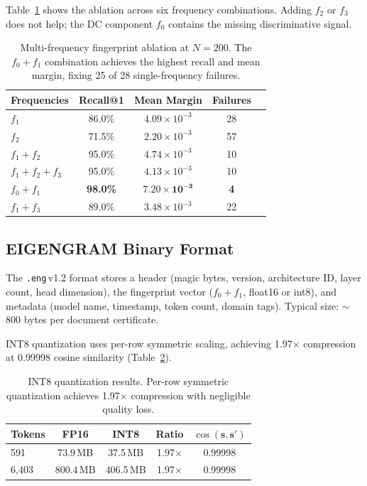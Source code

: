 \documentclass[11pt,twocolumn]{article}
\begin{document}
Table~\ref{tab:frequency-ablation} shows the ablation across six
frequency combinations. Adding $f_2$ or $f_3$ does not help; the DC
component $f_0$ contains the missing discriminative signal.

\begin{table}[t]
\centering
\caption{Multi-frequency fingerprint ablation at $N{=}200$. The
$f_0{+}f_1$ combination achieves the highest recall and mean margin,
fixing 25 of 28 single-frequency failures.}
\label{tab:frequency-ablation}
\small
\begin{tabular}{lcccc}
\toprule
Frequencies & Recall@1 & Mean Margin & Failures \\
\midrule
$f_1$ & 86.0\% & $4.09{\times}10^{-3}$ & 28 \\
$f_2$ & 71.5\% & $2.20{\times}10^{-3}$ & 57 \\
$f_1{+}f_2$ & 95.0\% & $4.74{\times}10^{-3}$ & 10 \\
$f_1{+}f_2{+}f_3$ & 95.0\% & $4.13{\times}10^{-3}$ & 10 \\
\rowcolor{green!10}
$f_0{+}f_1$ & \textbf{98.0\%} & $\mathbf{7.20{\times}10^{-3}}$ & \textbf{4} \\
$f_1{+}f_3$ & 89.0\% & $3.48{\times}10^{-3}$ & 22 \\
\bottomrule
\end{tabular}
\end{table}

\subsection{EIGENGRAM Binary Format}
\label{sec:eigengram}

The \texttt{.eng}\,v1.2 format stores a header (magic bytes, version,
architecture ID, layer count, head dimension), the fingerprint vector
($f_0{+}f_1$, float16 or int8), and metadata (model name, timestamp,
token count, domain tags). Typical size: ${\sim}$800 bytes per document
certificate.

INT8 quantization uses per-row symmetric scaling, achieving
1.97$\times$ compression at 0.99998 cosine similarity
(Table~\ref{tab:int8}).

\begin{table}[t]
\centering
\caption{INT8 quantization results. Per-row symmetric quantization
achieves 1.97$\times$ compression with negligible quality loss.}
\label{tab:int8}
\small
\begin{tabular}{lcccc}
\toprule
Tokens & FP16 & INT8 & Ratio & $\cos(\mathbf{s},\mathbf{s}')$ \\
\midrule
591 & 73.9\,MB & 37.5\,MB & 1.97$\times$ & 0.99998 \\
6,403 & 800.4\,MB & 406.5\,MB & 1.97$\times$ & 0.99998 \\
\bottomrule
\end{tabular}
\end{table}
\end{document}
